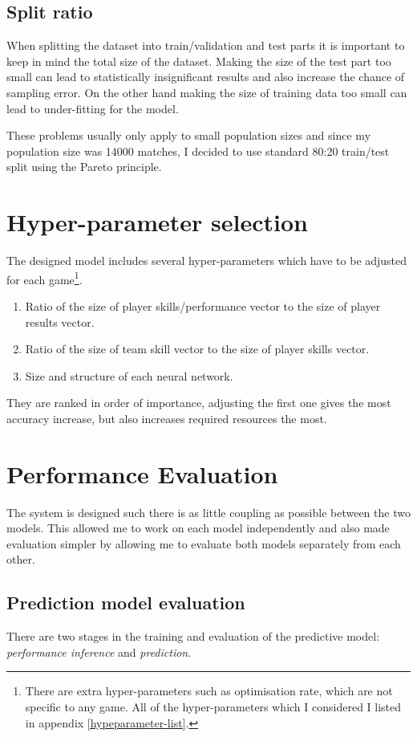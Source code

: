 \documentclass[12pt,a4paper]{book}
\begin{document}
\subsection{Split ratio}
When splitting the dataset into train/validation and test parts it is important to keep in mind the total size of the dataset.
Making the size of the test part too small can lead to statistically insignificant results and also increase the chance of sampling error.
On the other hand making the size of training data too small can lead to under-fitting for the model.

These problems usually only apply to small population sizes and since my population size was 14000 matches, I decided to use standard 80:20 train/test split using the Pareto principle.

\section{Hyper-parameter selection}
The designed model includes several hyper-parameters which have to be adjusted for each game\footnote{There are extra hyper-parameters such as optimisation rate, which are not specific to any game. All of the hyper-parameters which I considered I listed in appendix  \ref{hypeparameter-list}.}.
\begin{enumerate}
\item Ratio of the size of player skills/performance vector to the size of player results vector.
\item Ratio of the size of team skill vector to the size of player skills vector.
\item Size and structure of each neural network.
\end{enumerate}
They are ranked in order of importance, adjusting the first one gives the most accuracy increase, but also increases required resources the most.

\section{Performance Evaluation}
The system is designed such there is as little coupling as possible between the two models.
This allowed me to work on each model independently and also made evaluation simpler by allowing me to evaluate both models separately from each other.
\subsection{Prediction model evaluation}
There are two stages in the training and evaluation of the predictive model: \emph{performance inference} and \emph{prediction}.
\end{document}
